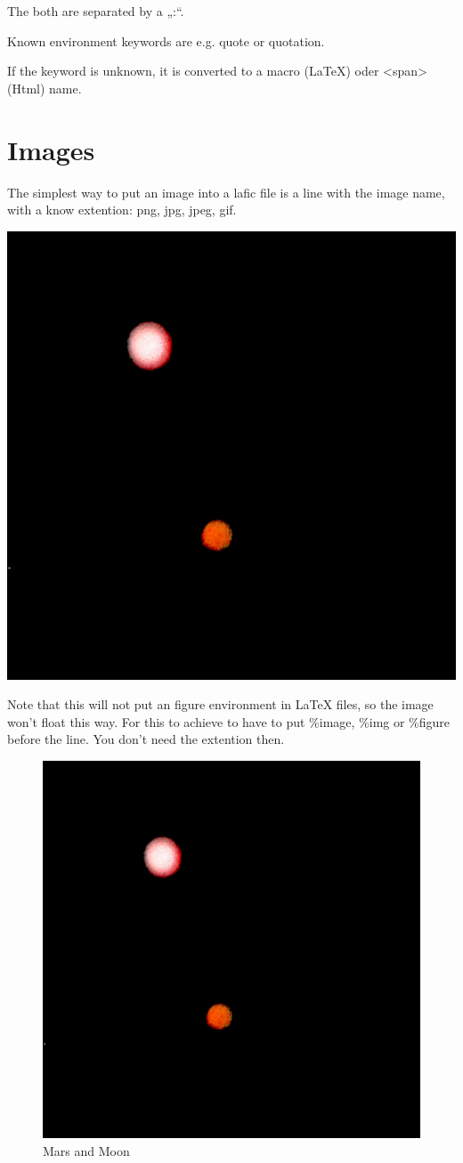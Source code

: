 \documentclass{scrartcl}
\begin{document}
The both are separated by a „:“.

Known environment keywords are e.g. quote or quotation.

If the keyword is unknown, it is converted to a macro
(LaTeX) oder <span> (Html) name.

\section{Images}

The simplest way to put an image into a lafic file is a
line with the image name, with a know extention: png, jpg,
jpeg, gif.

\includegraphics[width=.50\linewidth]{Image.png}

Note that this will not put an figure environment in \LaTeX
files, so the image won't float this way. For this to
achieve to have to put \%image, \%img or \%figure before the
line. You don't need the extention then.

\begin{figure}[hbt]
\includegraphics[height=.40\textheight]{Image.png}
\caption{Mars and Moon}
\label{bild1}
\end{figure}
\end{document}
